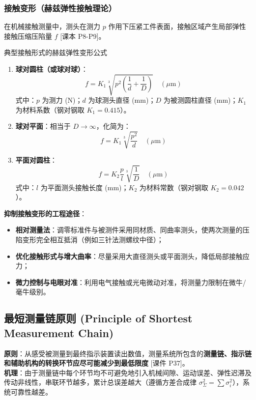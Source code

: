 \documentclass[11pt,a4paper]{ctexart}
\begin{document}
\subsubsection{接触变形（赫兹弹性接触理论）}
在机械接触测量中，测头在测力 $p$ 作用下压紧工件表面，接触区域产生局部弹性接触压缩压陷量 $f$ \hfill\textsf{[课本 P8-P9]}。
\begin{formulabox}{典型接触形式的赫兹弹性变形公式}
\begin{enumerate}[leftmargin=1.5em, itemsep=3pt]
    \item \textbf{球对圆柱（或球对球）}：
    \begin{equation}
    f = K_1 \sqrt[3]{p^2 \left( \frac{1}{d} + \frac{1}{D} \right)} \quad (\mu\text{m})
    \end{equation}
    式中：$p$ 为测力 (N)；$d$ 为球测头直径 (mm)；$D$ 为被测圆柱直径 (mm)；$K_1$ 为材料系数（钢对钢取 $K_1 = 0.415$）。
    
    \item \textbf{球对平面}：相当于 $D \to \infty$，化简为：
    \begin{equation}
    f = K_1 \sqrt[3]{\frac{p^2}{d}} \quad (\mu\text{m})
    \end{equation}
    
    \item \textbf{平面对圆柱}：
    \begin{equation}
    f = K_2 \frac{p}{l} \sqrt[3]{\frac{1}{D}} \quad (\mu\text{m})
    \end{equation}
    式中：$l$ 为平面测头接触长度 (mm)；$K_2$ 为材料常数（钢对钢取 $K_2 = 0.042$）。
\end{enumerate}
\end{formulabox}

\textbf{抑制接触变形的工程途径}：
\begin{itemize}[leftmargin=1.5em, itemsep=2pt]
    \item \textbf{相对测量法}：调零标准件与被测件采用同材质、同曲率测头，使两次测量的压陷变形完全相互抵消（例如三针法测螺纹中径）；
    \item \textbf{优化接触形式与增大曲率}：尽量采用大直径测头或平面测头，降低局部接触应力；
    \item \textbf{微力控制与电眼对准}：利用电气接触或光电微动对准，将测量力限制在微牛/毫牛级别。
\end{itemize}

\subsection{最短测量链原则 (Principle of Shortest Measurement Chain)}
\textbf{原则}：从感受被测量到最终指示装置读出数值，测量系统所包含的\textbf{测量链、指示链和辅助机构的转换环节应尽可能减少到最低限度} \hfill\textsf{[课件 P37]}。\\
\textbf{机理}：由于测量链中每个环节均不可避免地引入机械间隙、运动误差、弹性迟滞及传动非线性，串联环节越多，累计总误差越大（遵循方差合成律 $\sigma_{\Sigma}^2 = \sum \sigma_i^2$），系统可靠性越差。
\end{document}
